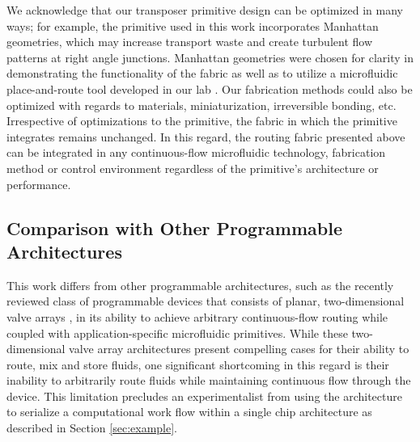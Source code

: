 We acknowledge that our transposer primitive design can be optimized in many ways; for example, the primitive used in this work incorporates Manhattan geometries, which may increase transport waste and create turbulent flow patterns at right angle junctions. Manhattan geometries were chosen for clarity in demonstrating the functionality of the fabric as well as to utilize a microfluidic place-and-route tool developed in our lab \cite{huang2014}. Our fabrication methods could also be optimized with regards to materials, miniaturization, irreversible bonding, etc. Irrespective of optimizations to the primitive, the fabric in which the primitive integrates remains unchanged. In this regard, the routing fabric presented above can be integrated in any continuous-flow microfluidic technology, fabrication method or control environment regardless of the primitive's architecture or performance. 

\subsection{Comparison with Other Programmable Architectures}
This work differs from other programmable architectures, such as the recently reviewed \cite{kim2016pneumatically} class of programmable devices that consists of planar, two-dimensional valve arrays \cite{fidalgo2011}\cite{thorsen2002}\cite{jensen2013}\cite{linshiz2016end}, in its ability to achieve arbitrary continuous-flow routing while coupled with application-specific microfluidic primitives. While these two-dimensional valve array architectures present compelling cases for their ability to route, mix and store fluids, one significant shortcoming in this regard is their inability to arbitrarily route fluids while maintaining continuous flow through the device. This limitation precludes an experimentalist from using the architecture to serialize a computational work flow within a single chip architecture as described in Section \ref{sec:example}. 

